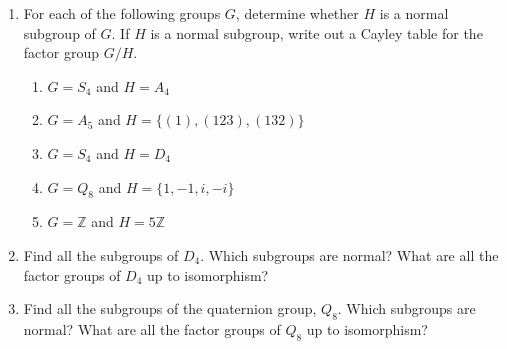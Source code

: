 {\small
 
 
\begin{enumerate}
 
 
\bf\item\rm
For each of the following groups $G$, determine whether $H$ is a normal
subgroup of $G$. If $H$ is a normal subgroup, write out a Cayley table
for the factor group $G/H$.
\begin{enumerate}
 
 \bf\item\rm
$G = S_4$ and $H = A_4$

 \bf\item\rm
$G = A_5$ and $H = \{ (1), (123), (132) \}$
 
 \bf\item\rm
$G = S_4$ and $H = D_4$
 
 \bf\item\rm
$G = Q_8$ and $H = \{ 1, -1, i, -i \}$
 
 \bf\item\rm
$G = {\mathbb Z}$ and $H = 5 {\mathbb Z}$
 
\end{enumerate}
 
 
\bf\item\rm
Find all the subgroups of $D_4$. Which subgroups are normal? What are
all the factor groups of $D_4$ up to isomorphism?
 
 
\bf\item\rm
Find all the subgroups of the quaternion group, $Q_8$. Which subgroups
are normal? What are all the factor groups of $Q_8$ up to isomorphism?
 
 
% 
 

\end{enumerate}}

